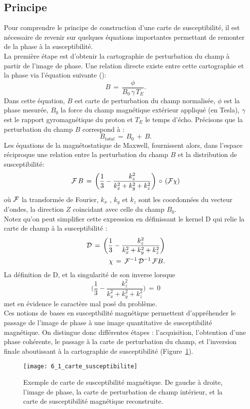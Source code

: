 \subsection{Principe}
Pour comprendre le principe de construction d’une carte de susceptibilité, il est nécessaire de
revenir sur quelques équations importantes permettant de remonter de la phase à la susceptibilité.\\
La première étape est d’obtenir la cartographie de perturbation du champ à partir de l’image
de phase. Une relation directe existe entre cette cartographie et la phase via l’équation suivante (\cite{Bilgic2012}):
\begin{equation}
\label{eq:champ_phase}
B\,=\,\frac{\phi}{B_0\,\gamma\,T_E}.
\end{equation}
Dans cette équation, $B$ est carte de perturbation du champ normalisée, $\phi$ est la phase
mesurée, $B_0 $ la force du champ magnétique extérieur appliqué (en Tesla), $\gamma$ est le rapport
gyromagnétique du proton et $T_E$ le temps d’écho. Précisons que la perturbation du champ $B$
correspond à :
\begin{equation}
B_{total}\,=\,B_0\,+\,B.
\end{equation}
Les équations de la magnétostatique de Maxwell, fournissent alors, dans l’espace réciproque
une relation entre la perturbation du champ $B $ et la distribution de susceptibilité:
\begin{equation}
{\cal F}\,B\,=\,\biggl(\frac{1}{3}-\frac{k_z^2}{k_x^2+k_y^2+k_z^2}\biggr)\,\circ\,({\cal F}\chi )
\end{equation}
où ${\cal F}$ la transformée de Fourier, $k_x$ , $k_y$ et $k_z$ sont les coordonnées du vecteur d’ondes, la direction $Z$
coincidant avec celle du champ $B_0$.\\
Notez qu’on peut simplifier cette expression en définissant le kernel D qui relie la carte de champ à la
susceptibilité :
\begin{eqnarray}
{\cal D}\,=\,\biggl(\frac{1}{3}-\frac{k_z^2}{k_x^2+k_y^2+k_z^2}\biggr)\\
\chi\,=\,{\cal F}^{-1}\,{\cal D}^{-1}\,{\cal F} B.
\end{eqnarray}
La définition de D, et la singularité de son inverse lorsque
\begin{equation}
\biggl(\frac{1}{3}-\frac{k_z^2}{k_x^2+k_y^2+k_z^2}\biggr)\,=\,0
\end{equation}
met en évidence le caractère mal posé du problème.\\
Ces notions de bases en susceptbilité magnétique permettent d’appréhender le passage de
l’image de phase à une image quantitative de susceptibilité magnétique. On distingue donc différentes
étapes : l’acquisition, l’obtention d’une phase cohérente, le passage à la carte de perturbation du
champ, et l’inversion finale aboutissant à la cartographie de susceptibilité (Figure~\ref{fig:6_1_carte_susceptibilite}).
\begin{figure}[!t]
\centering
\texttt{[image: 6\_1\_carte\_susceptibilite]}
\caption{Exemple de carte de susceptibilité magnétique. De gauche à droite, l'image de phase, la carte de perturbation
de champ intérieur, et la carte de susceptibilité magnétique reconstruite.}
\label{fig:6_1_carte_susceptibilite}	
\end{figure}
